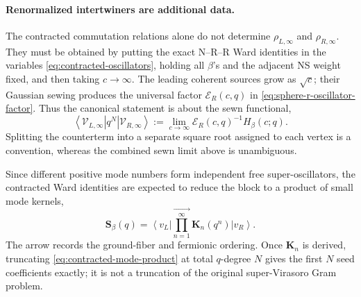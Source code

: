 \documentclass[11pt]{article}
\begin{document}
\paragraph{Renormalized intertwiners are additional data.}
The contracted commutation relations alone do not determine
\(\rho_{L,\infty}\) and \(\rho_{R,\infty}\).  They must be obtained by
putting the exact N--R--R Ward identities in the variables
\eqref{eq:contracted-oscillators}, holding all \(\beta\)'s and the adjacent
NS weight fixed, and then taking \(c\to\infty\).  The leading coherent
sources grow as \(\sqrt c\); their Gaussian sewing produces the universal
factor \(\mathcal E_R(c,q)\) in
\eqref{eq:sphere-r-oscillator-factor}.  Thus the canonical statement is
about the sewn functional,
\begin{equation}
 \left\langle\mathcal V_{L,\infty}\right|q^N
 \left|\mathcal V_{R,\infty}\right\rangle
 :=
 \lim_{c\to\infty}
 \mathcal E_R(c,q)^{-1}
 H_\beta(c;q).
 \label{eq:contracted-renormalized-vertices}
\end{equation}
Splitting the counterterm into a separate square root assigned to each
vertex is a convention, whereas the combined sewn limit above is
unambiguous.

Since different positive mode numbers form independent free
super-oscillators, the contracted Ward identities are expected to reduce
the block to a product of small mode kernels,
\begin{equation}
 \mathbf S_\beta(q)
 =
 \left\langle v_L\right|
 \overrightarrow{\prod_{n=1}^{\infty}}
 \mathbf K_n(q^n)
 \left|v_R\right\rangle .
 \label{eq:contracted-mode-product}
\end{equation}
The arrow records the ground-fiber and fermionic ordering.  Once
\(\mathbf K_n\) is derived, truncating
\eqref{eq:contracted-mode-product} at total \(q\)-degree \(N\) gives the
first \(N\) seed coefficients exactly; it is not a truncation of the
original super-Virasoro Gram problem.
\end{document}
